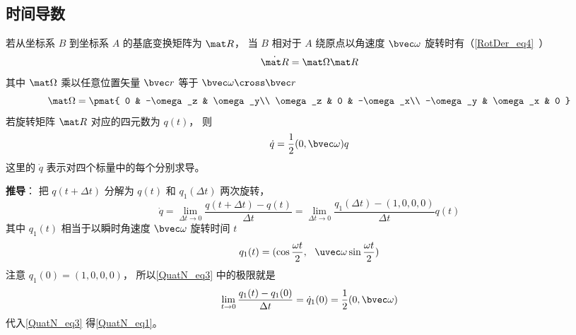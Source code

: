 \subsection{时间导数}
若从坐标系 $B$ 到坐标系 $A$ 的基底变换矩阵为 $\mat R$， 当 $B$ 相对于 $A$ 绕原点以角速度 $\bvec \omega$ 旋转时有（\autoref{RotDer_eq4}~）
\begin{equation}
\dot{\mat R} = \mat \Omega \mat R
\end{equation}
其中 $\mat\Omega$ 乘以任意位置矢量 $\bvec r$ 等于 $\bvec \omega \cross \bvec r$
\begin{equation}
\mat \Omega = \pmat{
0 & -\omega_z & \omega_y\\
\omega_z & 0 & -\omega_x\\
-\omega_y & \omega_x & 0
}\end{equation}
若旋转矩阵 $\mat R$ 对应的四元数为 $q(t)$， 则
\begin{equation}\label{QuatN_eq1}
\dot {q} = \frac12 (0, \bvec \omega) q
\end{equation}
这里的 $\dot{q}$ 表示对四个标量中的每个分别求导。

\textbf{推导}： 把 ${q}(t+\Delta t)$ 分解为 ${q}(t)$ 和 ${q}_1(\Delta t)$ 两次旋转， 
\begin{equation}\label{QuatN_eq3}
\dot {q}
= \lim_{\Delta t\to 0}\frac{{q}(t+\Delta t) - {q}(t)}{\Delta t}
= \lim_{\Delta t\to 0}\frac{{q}_1(\Delta t) - (1,0,0,0)}{\Delta t}q(t)
\end{equation}
其中 ${q}_1(t)$ 相当于以瞬时角速度 $\bvec \omega$ 旋转时间 $t$
\begin{equation}
{q_1}(t) = (\cos\frac{\omega t}{2},\ \ \uvec \omega \sin\frac{\omega t}{2})
\end{equation}
注意 $q_1(0) = (1,0,0,0)$， 所以\autoref{QuatN_eq3} 中的极限就是
\begin{equation}
\lim_{t\to 0}\frac{{q}_1(t) - {q}_1(0)}{\Delta t} = \dot{q}_1(0) = \frac{1}{2}(0, \bvec\omega)
\end{equation}
代入\autoref{QuatN_eq3} 得\autoref{QuatN_eq1}。
